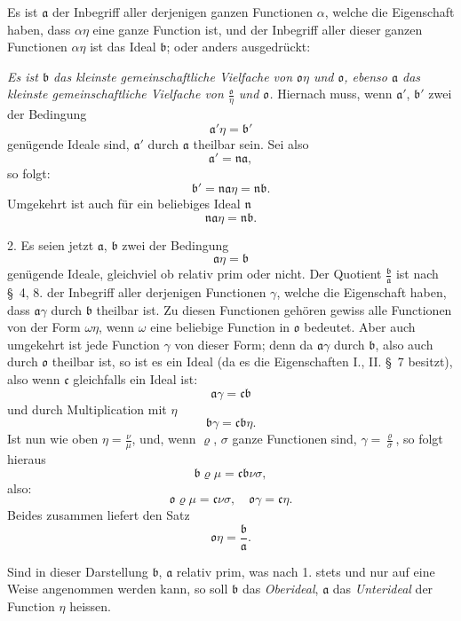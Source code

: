 \documentclass{article}
\begin{document}

Es ist $\mathfrak{a}$ der Inbegriff aller derjenigen ganzen Functionen $\alpha$, welche die Eigenschaft haben, dass $\alpha\eta$ eine ganze Function ist, und der Inbegriff aller dieser ganzen Functionen $\alpha\eta$ ist das Ideal $\mathfrak{b}$; oder anders ausgedrückt:

\emph{Es ist $\mathfrak{b}$ das kleinste gemeinschaftliche Vielfache von $\mathfrak{o}\eta$ und $\mathfrak{o}$, ebenso $\mathfrak{a}$ das kleinste gemeinschaftliche Vielfache von $\frac{\mathfrak{o}}{\eta}$ und $\mathfrak{o}$.} Hiernach muss, wenn $\mathfrak{a}'$, $\mathfrak{b}'$ zwei der Bedingung
\[ \mathfrak{a}'\eta = \mathfrak{b}' \]
genügende Ideale sind, $\mathfrak{a}'$ durch $\mathfrak{a}$ theilbar sein. Sei also
\[ \mathfrak{a}' = \mathfrak{n}\mathfrak{a}, \]
so folgt:
\[ \mathfrak{b}' = \mathfrak{n}\mathfrak{a}\eta = \mathfrak{n}\mathfrak{b}. \]
Umgekehrt ist auch für ein beliebiges Ideal $\mathfrak{n}$
\[ \mathfrak{n}\mathfrak{a}\eta = \mathfrak{n}\mathfrak{b}. \]

2. Es seien jetzt $\mathfrak{a}$, $\mathfrak{b}$ zwei der Bedingung
\[ \mathfrak{a}\eta = \mathfrak{b} \]
genügende Ideale, gleichviel ob relativ prim oder nicht. Der Quotient $\frac{\mathfrak{b}}{\mathfrak{a}}$ ist nach §~4, 8. der Inbegriff aller derjenigen Functionen $\gamma$, welche die Eigenschaft haben, dass $\mathfrak{a}\gamma$ durch $\mathfrak{b}$ theilbar ist. Zu diesen Functionen gehören gewiss alle Functionen von der Form $\omega\eta$, wenn $\omega$ eine beliebige Function in $\mathfrak{o}$ bedeutet. Aber auch umgekehrt ist jede Function $\gamma$ von dieser Form; denn da $\mathfrak{a}\gamma$ durch $\mathfrak{b}$, also auch durch $\mathfrak{o}$ theilbar ist, so ist es ein Ideal (da es die Eigenschaften I., II. §~7 besitzt), also wenn $\mathfrak{c}$ gleichfalls ein Ideal ist:
\[ \mathfrak{a}\gamma = \mathfrak{c}\mathfrak{b} \]
und durch Multiplication mit $\eta$
\[ \mathfrak{b}\gamma = \mathfrak{c}\mathfrak{b}\eta. \]
Ist nun wie oben $\eta = \frac{\nu}{\mu}$, und, wenn $\varrho$, $\sigma$ ganze Functionen sind, $\gamma = \frac{\varrho}{\sigma}$, so folgt hieraus
\[ \mathfrak{b}\varrho\mu = \mathfrak{c}\mathfrak{b}\nu\sigma, \]
also:
\[ \mathfrak{o}\varrho\mu = \mathfrak{c}\nu\sigma, \quad \mathfrak{o}\gamma = \mathfrak{c}\eta. \]
Beides zusammen liefert den Satz
\[ \mathfrak{o}\eta = \frac{\mathfrak{b}}{\mathfrak{a}}. \tag{3.} \]

Sind in dieser Darstellung $\mathfrak{b}$, $\mathfrak{a}$ relativ prim, was nach 1. stets und nur auf eine Weise angenommen werden kann, so soll $\mathfrak{b}$ das \emph{Oberideal}, $\mathfrak{a}$ das \emph{Unterideal} der Function $\eta$ heissen.
\end{document}
